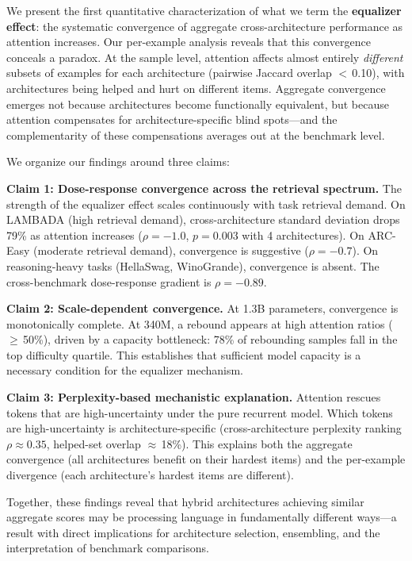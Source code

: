 \documentclass[11pt,a4paper]{article}
\begin{document}
We present the first quantitative characterization of what we term the \textbf{equalizer effect}: the systematic convergence of aggregate cross-architecture performance as attention increases.
Our per-example analysis reveals that this convergence conceals a paradox.
At the sample level, attention affects almost entirely \emph{different} subsets of examples for each architecture (pairwise Jaccard overlap $<$\,0.10), with architectures being helped and hurt on different items.
Aggregate convergence emerges not because architectures become functionally equivalent, but because attention compensates for architecture-specific blind spots---and the complementarity of these compensations averages out at the benchmark level.

We organize our findings around three claims:

\textbf{Claim 1: Dose-response convergence across the retrieval spectrum.}
The strength of the equalizer effect scales continuously with task retrieval demand.
On LAMBADA (high retrieval demand), cross-architecture standard deviation drops 79\% as attention increases ($\rho{=}{-}1.0$, $p{=}0.003$ with 4 architectures).
On ARC-Easy (moderate retrieval demand), convergence is suggestive ($\rho{=}{-}0.7$).
On reasoning-heavy tasks (HellaSwag, WinoGrande), convergence is absent.
The cross-benchmark dose-response gradient is $\rho{=}{-}0.89$.

\textbf{Claim 2: Scale-dependent convergence.}
At 1.3B parameters, convergence is monotonically complete.
At 340M, a rebound appears at high attention ratios ($\geq$\,50\%), driven by a capacity bottleneck: 78\% of rebounding samples fall in the top difficulty quartile.
This establishes that sufficient model capacity is a necessary condition for the equalizer mechanism.

\textbf{Claim 3: Perplexity-based mechanistic explanation.}
Attention rescues tokens that are high-uncertainty under the pure recurrent model.
Which tokens are high-uncertainty is architecture-specific (cross-architecture perplexity ranking $\rho \approx 0.35$, helped-set overlap $\approx$\,18\%).
This explains both the aggregate convergence (all architectures benefit on their hardest items) and the per-example divergence (each architecture's hardest items are different).

Together, these findings reveal that hybrid architectures achieving similar aggregate scores may be processing language in fundamentally different ways---a result with direct implications for architecture selection, ensembling, and the interpretation of benchmark comparisons.
\end{document}
